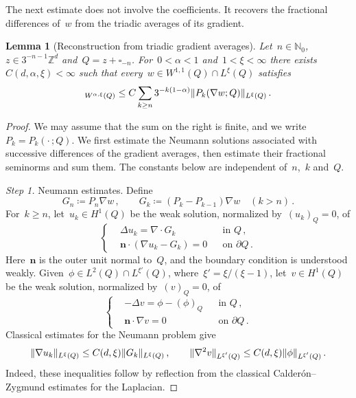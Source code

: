 \documentclass[11pt,letterpaper]{article}
\numberwithin{equation}{section}
\newtheorem{lemma}[theorem]{Lemma}
\theoremstyle{definition}
\newcommand{\N}{\mathbb{N}}
\newcommand{\Zd}{\mathbb{Z}^d}
\newcommand{\cu}{\square}
\DeclarePairedDelimiter{\norm}{\lVert}{\rVert}
\begin{document}
The next estimate does not involve the coefficients. It recovers the fractional differences of~$w$ from the triadic averages of its gradient.

\begin{lemma}[Reconstruction from triadic gradient averages]
\label{l.fractional.reconstruction}
Let~$n\in\N_0$,~$z\in3^{-n-1}\Zd$ and~$Q=z+\cu_{-n}$. For~$0<\alpha<1$ and~$1<\xi<\infty$ there exists~$C(d,\alpha,\xi)<\infty$ such that every~$w\in W^{1,1}(Q)\cap L^\xi(Q)$ satisfies
\begin{equation}
	[w]_{W^{\alpha,\xi}(Q)}\leq C\sum_{k\geq n}3^{-k(1-\alpha)}\norm{P_k(\nabla w;Q)}_{L^\xi(Q)}\,.
	\label{e.fractional.reconstruction}
\end{equation}
\end{lemma}

\begin{proof}
We may assume that the sum on the right is finite, and we write~$P_k=P_k(\cdot\,;Q)$. We first estimate the Neumann solutions associated with successive differences of the gradient averages, then estimate their fractional seminorms and sum them. The constants below are independent of~$n$,~$k$ and~$Q$.

\smallskip

\emph{Step 1.} Neumann estimates. Define
\begin{equation*}
	G_n\coloneqq P_n\nabla w\,,\qquad G_k\coloneqq(P_k-P_{k-1})\nabla w\quad(k>n)\,.
\end{equation*}
For~$k\geq n$, let~$u_k\in H^1(Q)$ be the weak solution, normalized by~$(u_k)_Q=0$, of
\begin{equation*}
	\left\{
	\begin{aligned}
		&\Delta u_k=\nabla\cdot G_k &&\mbox{in }Q\,,\\
		&\mathbf{n}\cdot(\nabla u_k-G_k)=0 &&\mbox{on }\partial Q\,.
	\end{aligned}
	\right.
\end{equation*}
Here~$\mathbf{n}$ is the outer unit normal to~$Q$, and the boundary condition is understood weakly. Given~$\phi\in L^2(Q)\cap L^{\xi'}(Q)$, where~$\xi'=\xi/(\xi-1)$, let~$v\in H^1(Q)$ be the weak solution, normalized by~$(v)_Q=0$, of
\begin{equation*}
	\left\{
	\begin{aligned}
		&-\Delta v=\phi-(\phi)_Q &&\mbox{in }Q\,,\\
		&\mathbf{n}\cdot\nabla v=0 &&\mbox{on }\partial Q\,.
	\end{aligned}
	\right.
\end{equation*}
Classical estimates for the Neumann problem give
\begin{equation*}
	\norm{\nabla u_k}_{L^\xi(Q)}\leq C(d,\xi)\norm{G_k}_{L^\xi(Q)}\,,\qquad \norm{\nabla^2v}_{L^{\xi'}(Q)}\leq C(d,\xi)\norm{\phi}_{L^{\xi'}(Q)}\,.
\end{equation*}
Indeed, these inequalities follow by reflection from the classical Calder\'on--Zygmund estimates for the Laplacian.


\end{proof}
\end{document}
